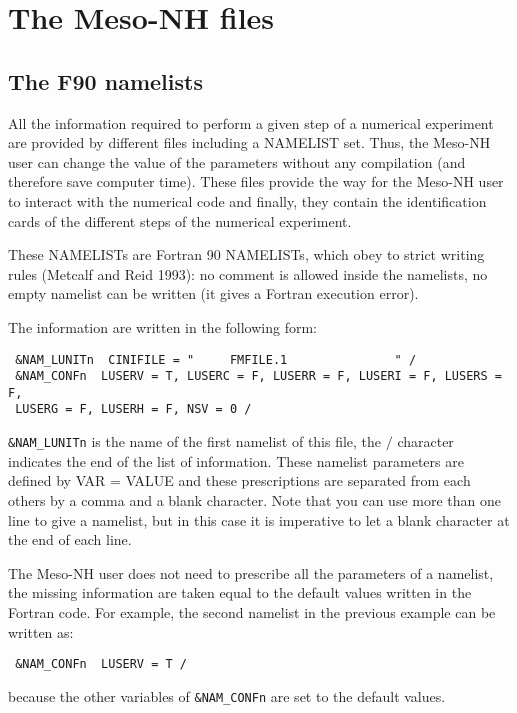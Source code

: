 \chapter{The Meso-NH files}
  
\section{The F90 namelists}

All the information required  to  perform a given step of a numerical
experiment are provided by
different files including a NAMELIST set. 
Thus, the Meso-NH user can change the value of the parameters without
any compilation (and therefore save computer time). These files provide the way 
for the Meso-NH user to interact with the numerical code and finally, they
 contain the identification
cards of the different steps of the numerical experiment. 


These NAMELISTs are Fortran 90
NAMELISTs, which obey to strict writing rules (Metcalf and Reid 1993): no
comment is allowed inside the namelists, no empty namelist can be written (it
gives a Fortran execution error). 

The information are written in the following form:

\begin{verbatim}
 &NAM_LUNITn  CINIFILE = "     FMFILE.1               " /
 &NAM_CONFn  LUSERV = T, LUSERC = F, LUSERR = F, LUSERI = F, LUSERS = F,
 LUSERG = F, LUSERH = F, NSV = 0 /
\end{verbatim}


 {\tt \&NAM\_LUNITn}
is the name of the first namelist of this file, the $/$ character indicates the 
end of the list of information. These namelist  parameters are defined by VAR = VALUE and
these prescriptions are separated from each others by a comma and a blank 
character. Note that you can use more than one line to give a namelist, but in
this case it is imperative to let a blank character at the end of each line.
 
The Meso-NH user does not need to prescribe all the parameters of a namelist,
the missing information are taken equal to the default values
written in the Fortran code. For example, the second namelist in the previous 
example can be written as:
\begin{verbatim}
 &NAM_CONFn  LUSERV = T /
\end{verbatim}
because the other variables of {\tt \&NAM\_CONFn} are set to the default values.
\\

